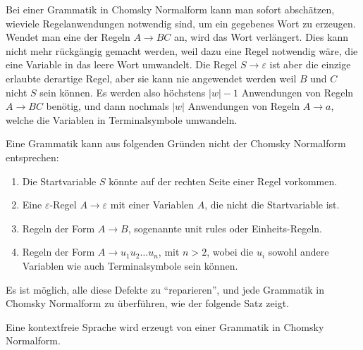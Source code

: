 Bei einer Grammatik in Chomsky Normalform kann man sofort abschätzen,
wieviele Regelanwendungen notwendig sind, um ein gegebenes Wort
zu erzeugen. Wendet man eine der Regeln $A\to BC$ an, wird das
Wort verlängert. Dies kann nicht mehr rückgängig gemacht
werden, weil dazu eine Regel notwendig wäre, die eine Variable
in das leere Wort umwandelt. Die Regel $S\to\varepsilon$ ist aber
die einzige erlaubte derartige Regel, aber sie kann nie angewendet
werden weil $B$ und $C$ nicht $S$ sein können. Es werden also
höchstens $|w|-1$ Anwendungen von Regeln $A\to BC$ benötig, und dann
nochmals $|w|$ Anwendungen von Regeln $A\to a$, welche die Variablen
in Terminalsymbole umwandeln. 

Eine Grammatik kann aus folgenden Gründen nicht der Chomsky Normalform
entsprechen:
\begin{enumerate}
\item Die Startvariable $S$ könnte auf der rechten Seite einer
Regel vorkommen.
\item Eine $\varepsilon$-Regel $A\to\varepsilon$ mit einer Variablen
$A$, die nicht die Startvariable ist.
%
%
\item Regeln der Form $A\to B$, sogenannte unit rules oder Einheits-Regeln.
\item Regeln der Form $A\to u_1u_2\dots u_n$, mit $n>2$, wobei
die $u_i$ sowohl andere Variablen wie auch Terminalsymbole sein 
können.
\end{enumerate}
Es ist möglich, alle diese Defekte zu ``reparieren'', und jede
Grammatik in Chomsky Normalform zu überführen, wie der folgende Satz
zeigt.

\begin{satz}
\label{satz:cnf}
Eine kontextfreie Sprache wird erzeugt von einer Grammatik
in Chomsky Normalform.
\end{satz}

